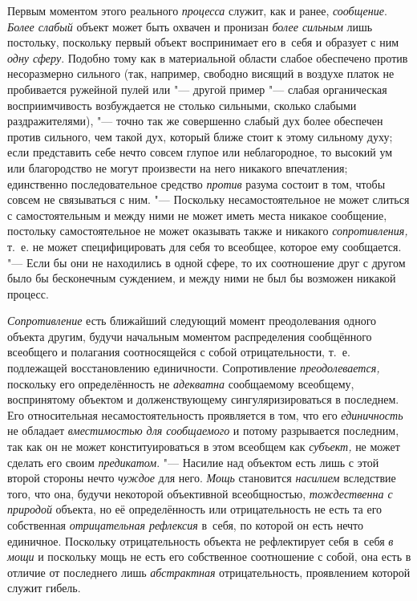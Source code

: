 Первым моментом этого реального
{\em процесса} служит,
как и ранее, {\em сообщение}.
{\em Более слабый} объект
может быть охвачен и пронизан {\em более
сильным} лишь постольку, поскольку первый объект
воспринимает его в~себя и образует с ним
{\em одну сферу}. Подобно
тому как в материальной области слабое обеспечено против несоразмерно
сильного (так, например, свободно висящий в воздухе платок не пробивается
ружейной пулей или "--- другой пример "--- слабая
органическая восприимчивость возбуждается не столько сильными, сколько
слабыми раздражителями), "--- точно так же совершенно слабый
дух более обеспечен против сильного, чем такой дух, который ближе стоит к
этому сильному духу; если представить себе нечто совсем глупое или
неблагородное, то высокий ум или благородство не могут произвести на него
никакого впечатления; единственно последовательное средство
{\em против} разума
состоит в том, чтобы совсем не связываться с ним. "---
Поскольку несамостоятельное не может слиться с
самостоятельным и между ними не может иметь места никакое сообщение,
постольку самостоятельное не может оказывать также и никакого
{\em сопротивления,}
т.~е. не может специфицировать для себя то всеобщее, которое
ему сообщается. "--- Если бы они не находились в одной сфере,
то их соотношение друг с другом было бы бесконечным
суждением, и между ними не был бы возможен никакой процесс.

{\em Сопротивление} есть
ближайший следующий момент преодолевания одного объекта другим, будучи
начальным моментом распределения сообщённого всеобщего и полагания
соотносящейся с собой отрицательности, т.~е. подлежащей восстановлению
единичности. Сопротивление
{\em преодолевается,}
поскольку его определённость не
{\em адекватна}
сообщаемому всеобщему, воспринятому объектом и
долженствующему сингуляризироваться в последнем. Его относительная
несамостоятельность проявляется в том, что его
{\em единичность} не
обладает {\em вместимостью для
сообщаемого} и потому разрывается последним, так как он не
может конституироваться в этом всеобщем как
{\em субъект,} не может
сделать его своим {\em предикатом}. "---
Насилие над объектом есть лишь с этой второй стороны нечто
{\em чуждое} для него.
{\em Мощь} становится
{\em насилием} вследствие
того, что она, будучи некоторой объективной всеобщностью,
{\em тождественна с природой}
объекта, но её определённость или отрицательность не есть та
его собственная {\em отрицательная
рефлексия} в~себя, по которой он есть нечто единичное.
Поскольку отрицательность объекта не рефлектирует себя в~себя
{\em в мощи} и поскольку
мощь не есть его собственное соотношение с собой, она есть в отличие от
последнего лишь {\em абстрактная}
отрицательность, проявлением которой служит гибель.

